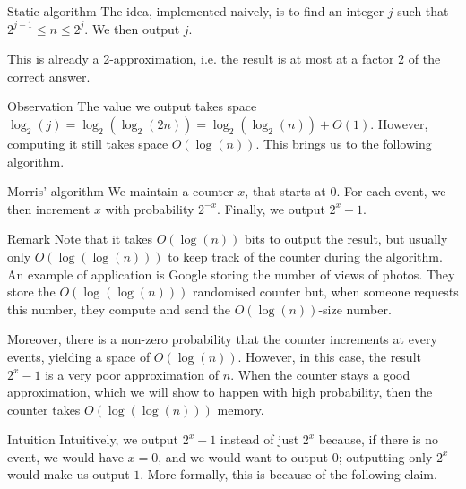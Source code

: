 \documentclass[a4paper]{article}
\begin{document}
\begin{parag}{Static algorithm}
    The idea, implemented naively, is to find an integer $j$ such that $2^{j-1} \leq n \leq 2^j$. We then output $j$. 

    This is already a 2-approximation, i.e. the result is at most at a factor $2$ of the correct answer.

    \begin{subparag}{Observation}
        The value we output takes space $\log_2\left(j\right) = \log_2\left(\log_2\left(2n\right)\right) = \log_2\left(\log_2\left(n\right)\right) + O\left(1\right)$. However, computing it still takes space $O\left(\log\left(n\right)\right)$. This brings us to the following algorithm.
    \end{subparag}
\end{parag}

\begin{parag}{Morris' algorithm}
    We maintain a counter $x$, that starts at $0$. For each event, we then increment $x$ with probability $2^{-x}$. Finally, we output $2^x - 1$.

    \begin{subparag}{Remark}
        Note that it takes $O\left(\log\left(n\right)\right)$ bits to output the result, but usually only $O\left(\log\left(\log\left(n\right)\right)\right)$ to keep track of the counter during the algorithm. An example of application is Google storing the number of views of photos. They store the $O\left(\log\left(\log\left(n\right)\right)\right)$ randomised counter but, when someone requests this number, they compute and send the $O\left(\log\left(n\right)\right)$-size number.

        Moreover, there is a non-zero probability that the counter increments at every events, yielding a space of $O\left(\log\left(n\right)\right)$. However, in this case, the result $2^x - 1$ is a very poor approximation of $n$. When the counter stays a good approximation, which we will show to happen with high probability, then the counter takes $O\left(\log\left(\log\left(n\right)\right)\right)$ memory.
    \end{subparag}

    \begin{subparag}{Intuition}
        Intuitively, we output $2^x - 1$ instead of just $2^x$ because, if there is no event, we would have $x = 0$, and we would want to output $0$; outputting only $2^x$ would make us output $1$. More formally, this is because of the following claim.
    \end{subparag}
\end{parag}
\end{document}
